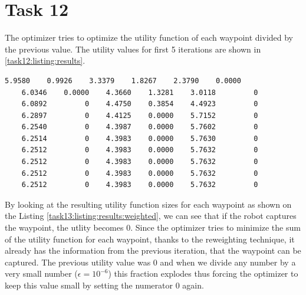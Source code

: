 \section {Task 12}
\noindent{}

The optimizer tries to optimize the utility function of each waypoint divided by the previous value. The utility values for first 5 iterations are shown in \ref{task12:listing:results}.

\begin{lstlisting}[label=task12:listing:results, caption=Unweighted utility function for each waypoint., float=!htb]
    5.9580    0.9926    3.3379    1.8267    2.3790    0.0000
    6.0346    0.0000    4.3660    1.3281    3.0118         0
    6.0892         0    4.4750    0.3854    4.4923         0
    6.2897         0    4.4125    0.0000    5.7152         0
    6.2540         0    4.3987    0.0000    5.7602         0
    6.2514         0    4.3983    0.0000    5.7630         0
    6.2512         0    4.3983    0.0000    5.7632         0
    6.2512         0    4.3983    0.0000    5.7632         0
    6.2512         0    4.3983    0.0000    5.7632         0
    6.2512         0    4.3983    0.0000    5.7632         0
\end{lstlisting}

By looking at the resulting utility function sizes for each waypoint as shown on the Listing \ref{task13:listing:results:weighted}, we can see that if the robot captures the waypoint, the utlity becomes $0$. Since the optimizer tries to minimize the sum of the utility function for each waypoint, thanks to the reweighting technique, it already has the information from the previous iteration, that the waypoint can be captured. The previous utility value was $0$ and when we divide any number by a very small number ($\epsilon = 10^{-6}$) this fraction explodes thus forcing the optimizer to keep this value small by setting the numerator $0$ again.  